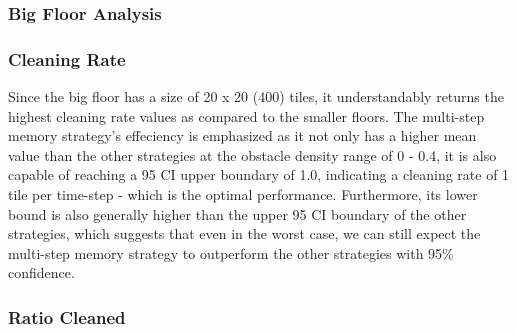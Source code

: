 \documentclass[11pt]{article}
\begin{document}
    \begin{center}
    \end{center}

    
    \begin{center}
    \end{center}

    
    \begin{center}
    \end{center}

    
    \subsubsection{Big Floor Analysis}

    \subsubsection*{Cleaning Rate}

Since the big floor has a size of 20 x 20 (400) tiles, it understandably
returns the highest cleaning rate values as compared to the smaller
floors. The multi-step memory strategy's effeciency is emphasized as it
not only has a higher mean value than the other strategies at the
obstacle density range of 0 - 0.4, it is also capable of reaching a 95
CI upper boundary of 1.0, indicating a cleaning rate of 1 tile per
time-step - which is the optimal performance. Furthermore, its lower
bound is also generally higher than the upper 95 CI boundary of the
other strategies, which suggests that even in the worst case, we can
still expect the multi-step memory strategy to outperform the other
strategies with 95\% confidence.

 \subsubsection*{Ratio Cleaned}
\end{document}
